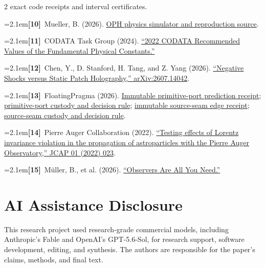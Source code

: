 \documentclass[10pt]{article}
\newcommand{\refentry}[2]{\par\noindent\hangindent=2.1em\hangafter=1\textbf{#1}\ #2}
\begin{document}
{\begin{multicols}{2}
{{exact code receipts and interval certificates}.}
\refentry{[10]}{Mueller, B. (2026).
\href{https://github.com/muellerberndt/oph-physics-sim}
{OPH physics simulator and reproduction source}.}
\refentry{[11]}{CODATA Task Group (2024).
\href{https://physics.nist.gov/cuu/pdf/wall_2022.pdf}
{``2022 CODATA Recommended Values of the Fundamental Physical Constants.''}}
\refentry{[12]}{Chen, Y., D. Stanford, H. Tang, and Z. Yang (2026).
\href{https://arxiv.org/abs/2607.14042}
{``Negative Shocks versus Static Patch Holography,'' arXiv:2607.14042}.}
\refentry{[13]}{FloatingPragma (2026).
\href{https://github.com/FloatingPragma/observer-patch-holography/blob/66176656dc1143f9ec50ba1a6e409c403545857f/code/a5_fingerprint/runtime/spin_six_primitive_port_prediction_receipt.json}
{Immutable primitive-port prediction receipt};
\href{https://github.com/FloatingPragma/oph-meta/tree/8cc5261653e37cbca0e6017fcc95a9fe7f649963/falsification/frozen_targets/fz11_2026-07-31}
{primitive-port custody and decision rule};
\href{https://github.com/FloatingPragma/observer-patch-holography/blob/bc5595f8dbb2d2886e2a64ddf447f69fbb00eb3f/code/a5_fingerprint/runtime/seam_current_edge_prediction_receipt.json}
{immutable source-seam edge receipt};
\href{https://github.com/FloatingPragma/oph-meta/tree/25da61a800226e0232336ccc86de8dec7d6b51c6/falsification/frozen_targets/fz12_2026-08-02}
{source-seam custody and decision rule}.}
\refentry{[14]}{Pierre Auger Collaboration (2022).
\href{https://doi.org/10.1088/1475-7516/2022/01/023}
{``Testing effects of Lorentz invariance violation in the propagation of
astroparticles with the Pierre Auger Observatory,'' JCAP 01 (2022) 023}.}
\refentry{[15]}{M\"uller, B., et al. (2026).
\href{https://github.com/FloatingPragma/observer-patch-holography/blob/main/paper/observers_are_all_you_need.pdf}
{``Observers Are All You Need.''}}
\end{multicols}
}

\section*{AI Assistance Disclosure}
This research project used research-grade commercial models, including
Anthropic's Fable and OpenAI's GPT-5.6-Sol, for research support, software
development, editing, and synthesis. The authors are responsible for the
paper's claims, methods, and final text.
\end{document}
